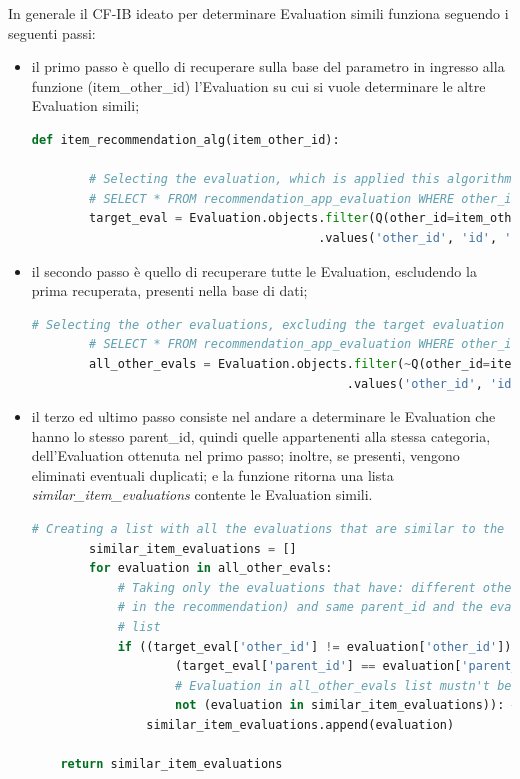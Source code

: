 In generale il CF-IB ideato per determinare Evaluation simili funziona seguendo i seguenti passi:
\begin{itemize}
	\item il primo passo è quello di recuperare sulla base del parametro in ingresso alla funzione (item\_other\_id)
	l'Evaluation su cui si vuole determinare le altre Evaluation simili;
	\begin{lstlisting}[language=Python, label=lst:IB_CF_Evaluation_1]
	def item_recommendation_alg(item_other_id):

		# Selecting the evaluation, which is applied this algorithm, from its other_id
		# SELECT * FROM recommendation_app_evaluation WHERE other_id = %(item_other_id)s AND node_type = 'eva'
		target_eval = Evaluation.objects.filter(Q(other_id=item_other_id) & Q(node_type="eva"))\
										.values('other_id', 'id', 'parent_id')[0]
	\end{lstlisting} 
	\item il secondo passo è quello di recuperare tutte le Evaluation, escludendo la prima recuperata, presenti nella base di dati;
	\begin{lstlisting}[language=Python, label=lst:IB_CF_Evaluation_2]
		# Selecting the other evaluations, excluding the target evaluation
		# SELECT * FROM recommendation_app_evaluation WHERE other_id != %(item_other_id)s AND node_type = 'eva'
		all_other_evals = Evaluation.objects.filter(~Q(other_id=item_other_id) & Q(node_type="eva"))\
											.values('other_id', 'id', 'parent_id').order_by('other_id')
	\end{lstlisting}
	\item il terzo ed ultimo passo consiste nel andare a determinare le Evaluation che hanno lo stesso parent\_id, quindi
	quelle appartenenti alla stessa categoria, dell'Evaluation ottenuta nel primo passo; inoltre, se presenti, vengono 
	eliminati eventuali duplicati; e la funzione ritorna una lista \textit{similar\_item\_evaluations} contente le Evaluation simili.
	\begin{lstlisting}[language=Python, label=lst:IB_CF_Evaluation_3]
		# Creating a list with all the evaluations that are similar to the target evaluation (comparing the parent_id)
		similar_item_evaluations = []
		for evaluation in all_other_evals:
			# Taking only the evaluations that have: different other_id (excluding the target evaluation
			# in the recommendation) and same parent_id and the evaluations that weren't added to similar_item_evaluations
			# list
			if ((target_eval['other_id'] != evaluation['other_id']) and  # Evaluations must have different 'other_id'
					(target_eval['parent_id'] == evaluation['parent_id']) and  # Evaluations must have same 'parent_id'
					# Evaluation in all_other_evals list mustn't be already added to \
					not (evaluation in similar_item_evaluations)): # the 'similar_item_evaluations' list
				similar_item_evaluations.append(evaluation)

	return similar_item_evaluations	
	\end{lstlisting}
\end{itemize}

